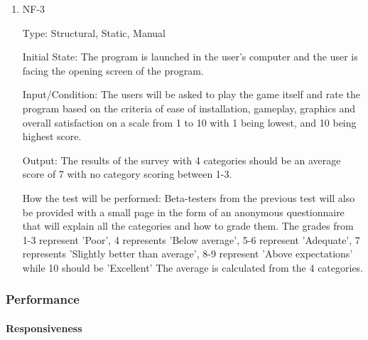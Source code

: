 \documentclass[12pt, titlepage]{article}
\begin{document}
\begin{enumerate}

\item{NF-3\\}

Type: Structural, Static, Manual
                    
Initial State: The program is launched in the user's computer and the user is facing the opening screen of the program. 
                    
Input/Condition: The users will be asked to play the game itself and rate the program based on the criteria of ease of installation, gameplay, graphics and overall satisfaction on a scale from 1 to 10 with 1 being lowest, and 10 being highest score.
                    
Output: The results of the survey with 4 categories should be an average score of 7 with no category scoring between 1-3.
                    
How the test will be performed: Beta-testers from the previous test will also be provided with a small page in the form of an anonymous questionnaire that will explain all the categories and how to grade them. The grades from 1-3 represent 'Poor', 4 represents 'Below average', 5-6 represent 'Adequate', 7 represents 'Slightly better than average', 8-9 represent 'Above expectations' while 10 should be 'Excellent' The average is calculated from the 4 categories.

\end{enumerate}

\subsubsection{Performance}
        
\paragraph{Responsiveness}
\end{document}
